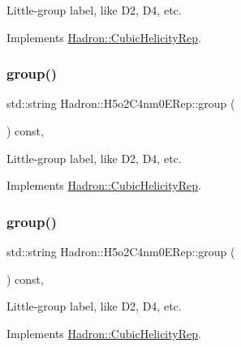 Little-\/group label, like D2, D4, etc. 

Implements \mbox{\hyperlink{structHadron_1_1CubicHelicityRep_a101a7d76cd8ccdad0f272db44b766113}{Hadron\+::\+Cubic\+Helicity\+Rep}}.

\mbox{\label{structHadron_1_1H5o2C4nm0ERep_ab94ac981b014d47f96785b1985df343c}} 
\subsubsection{\texorpdfstring{group()}{group()}\hspace{0.1cm}{\footnotesize\ttfamily [2/3]}}
{\footnotesize\ttfamily std\+::string Hadron\+::\+H5o2\+C4nm0\+E\+Rep\+::group (\begin{DoxyParamCaption}{ }\end{DoxyParamCaption}) const\hspace{0.3cm}{\ttfamily [inline]}, {\ttfamily [virtual]}}

Little-\/group label, like D2, D4, etc. 

Implements \mbox{\hyperlink{structHadron_1_1CubicHelicityRep_a101a7d76cd8ccdad0f272db44b766113}{Hadron\+::\+Cubic\+Helicity\+Rep}}.

\mbox{\label{structHadron_1_1H5o2C4nm0ERep_ab94ac981b014d47f96785b1985df343c}} 
\subsubsection{\texorpdfstring{group()}{group()}\hspace{0.1cm}{\footnotesize\ttfamily [3/3]}}
{\footnotesize\ttfamily std\+::string Hadron\+::\+H5o2\+C4nm0\+E\+Rep\+::group (\begin{DoxyParamCaption}{ }\end{DoxyParamCaption}) const\hspace{0.3cm}{\ttfamily [inline]}, {\ttfamily [virtual]}}

Little-\/group label, like D2, D4, etc. 

Implements \mbox{\hyperlink{structHadron_1_1CubicHelicityRep_a101a7d76cd8ccdad0f272db44b766113}{Hadron\+::\+Cubic\+Helicity\+Rep}}.

